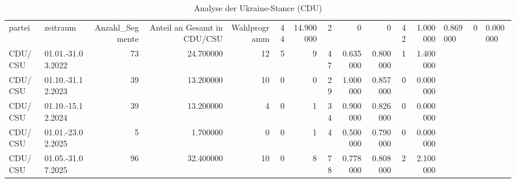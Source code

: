 \begin{table}
\caption{Analyse der Ukraine-Stance (CDU)}
\label{tab:meine_tabelle}
\begin{tabular}{llrrrrrrrrrr}
\toprule
partei & zeitraum & Anzahl_Segmente & Anteil an Gesamt in %
\midrule
CDU/CSU & Wahlprogramm & 44 & 14.900000 & 2 & 0 & 0 & 42 & 1.000000 & 0.869000 & 0 & 0.000000 \\
CDU/CSU & 01.01.-31.03.2022 & 73 & 24.700000 & 12 & 5 & 9 & 47 & 0.635000 & 0.800000 & 1 & 1.400000 \\
CDU/CSU & 01.10.-31.12.2023 & 39 & 13.200000 & 10 & 0 & 0 & 29 & 1.000000 & 0.857000 & 0 & 0.000000 \\
CDU/CSU & 01.10.-15.12.2024 & 39 & 13.200000 & 4 & 0 & 1 & 34 & 0.900000 & 0.826000 & 0 & 0.000000 \\
CDU/CSU & 01.01.-23.02.2025 & 5 & 1.700000 & 0 & 0 & 1 & 4 & 0.500000 & 0.790000 & 0 & 0.000000 \\
CDU/CSU & 01.05.-31.07.2025 & 96 & 32.400000 & 10 & 0 & 8 & 78 & 0.778000 & 0.808000 & 2 & 2.100000 \\
\bottomrule
\end{tabular}
\end{table}
